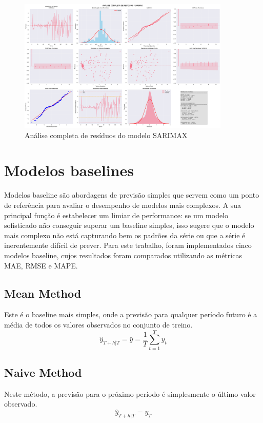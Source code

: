 \documentclass{article}
\begin{document}
\begin{figure}[H]
    \centering
    \includegraphics[width=0.9\textwidth]{images/sarimax_analisado.png}
    \caption{Análise completa de resíduos do modelo SARIMAX}
    \label{fig:sarimax_residuals}
\end{figure}



\section*{Modelos baselines}

Modelos baseline são abordagens de previsão simples que servem como um ponto de referência para avaliar o desempenho de modelos mais complexos. A sua principal função é estabelecer um limiar de performance: se um modelo sofisticado não conseguir superar um baseline simples, isso sugere que o modelo mais complexo não está capturando bem os padrões da série ou que a série é inerentemente difícil de prever. Para este trabalho, foram implementados cinco modelos baseline, cujos resultados foram comparados utilizando as métricas MAE, RMSE e MAPE.

\subsection*{Mean Method}
Este é o baseline mais simples, onde a previsão para qualquer período futuro é a média de todos os valores observados no conjunto de treino.
$$ \hat{y}_{T+h|T} = \bar{y} = \frac{1}{T}\sum_{t=1}^{T}y_t $$

\subsection*{Naive Method}
Neste método, a previsão para o próximo período é simplesmente o último valor observado.
$$ \hat{y}_{T+h|T} = y_T $$
\end{document}
